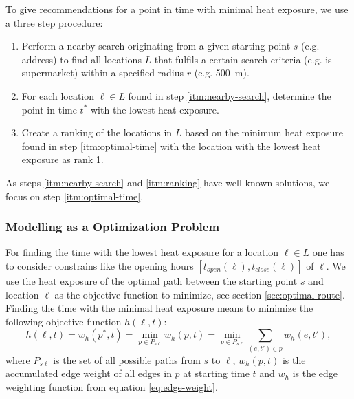  To give recommendations for a point in time with minimal heat exposure, we use a three step procedure: 
 
 \begin{enumerate}
 	\item \label{itm:nearby-search} Perform a nearby search originating from a given starting point $s$ (e.g. address) to find all locations $L$ that fulfils a certain search criteria (e.g. is supermarket) within a specified radius $r$ (e.g. \SI{500}{\meter}).
 	
 	\item \label{itm:optimal-time} For each location $\ell \in L$ found in step \ref{itm:nearby-search}, determine the point in time $t^*$ with the lowest heat exposure. 
 	
 	\item \label{itm:ranking} Create a ranking of the locations in $L$ based on the minimum heat exposure found in step \ref{itm:optimal-time} with the location with the lowest heat exposure as rank 1.
 \end{enumerate} 

As steps \ref{itm:nearby-search} and \ref{itm:ranking} have well-known solutions, we focus on step \ref{itm:optimal-time}. 

\subsubsection{Modelling as a Optimization Problem} 

For finding the time with the lowest heat exposure for a location $\ell \in L$ one has to consider constrains like the opening hours $[t_{open}(\ell),t_{close}(\ell)]$ of $\ell$.  We use the heat exposure of the optimal path between the starting point $s$ and location $\ell$ as the objective function to minimize, see section \ref{sec:optimal-route}. Finding the time with the minimal heat exposure means to minimize the following objective function $h(\ell, t)$:
	\begin{equation}\label{eq:objective-funtion}
		h(\ell, t) = w_h(p^*, t) = \min_{p\in P_{s\ell}} w_h(p, t) = \min_{p\in P_{s\ell}} \sum_{(e, t') \in p} w_h(e, t'),
	\end{equation}
where $P_{s\ell}$ is the set of all possible paths from $s$ to $\ell$,  $w_h(p, t)$ is the accumulated edge weight of all edges in $p$ at starting time $t$ and $w_h$ is the edge weighting function from equation \eqref{eq:edge-weight}. 

